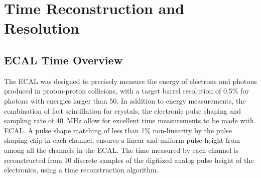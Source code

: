 \chapter{Time Reconstruction and Resolution}
\section*{ECAL Time Overview}
The ECAL was designed to precisely measure the energy of electrons and photons produced in proton-proton collisions, with a target barrel resolution of 0.5\% for photons with energies larger than 50\GeV. In addition to energy measurements, the combination of fast scintillation for \pb crystals, the electronic pulse shaping and sampling rate of 40~MHz allow for excellent time measurements to be made with ECAL. A pulse shape matching of less than 1\% non-linearity by the pulse shaping chip in each channel, ensures a linear and uniform pulse height from among all the channels in the ECAL.  
The time measured by each channel is reconstructed from 10 discrete samples of the digitized analog pulse height of the electronics, using a time reconstruction algorithm. 


